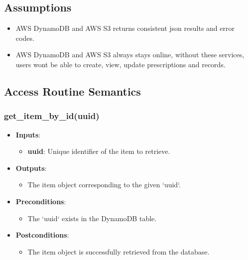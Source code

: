 \documentclass[12pt, titlepage]{article}
\begin{document}
\subsection{Assumptions}
\begin{itemize}
    \item AWS DynamoDB and AWS S3 returns consistent json results and error codes.
    \item AWS DynamoDB and AWS S3 always stays online, without these services, users wont be able to create, view, update prescriptions and records.
\end{itemize}

\subsection{Access Routine Semantics}

\subsubsection{get\_item\_by\_id(uuid)}
\begin{itemize}
    \item \textbf{Inputs}:
        \begin{itemize}
            \item \textbf{uuid}: Unique identifier of the item to retrieve.
        \end{itemize}
    \item \textbf{Outputs}:
        \begin{itemize}
            \item The item object corresponding to the given `uuid`.
        \end{itemize}
    \item \textbf{Preconditions}:
        \begin{itemize}
            \item The `uuid` exists in the DynamoDB table.
        \end{itemize}
    \item \textbf{Postconditions}:
        \begin{itemize}
            \item The item object is successfully retrieved from the database.
        \end{itemize}
\end{itemize}
\end{document}
